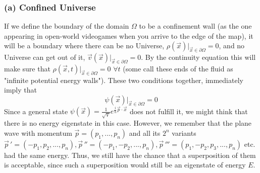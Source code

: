 \documentclass[11pt, a4paper]{article} %
\begin{document}
\subsubsection*{(a) Confined Universe}
If we define the boundary of the domain $\Omega$ to be a confinement wall (as the one appearing in open-world videogames when you arrive to the edge of the map), it will be a boundary where there can be no Universe, $\rho(\vec{x})\Big\rvert_{\vec{x}\in\partial\Omega}=0$, and no Universe can get out of it, $\vec{v}(\vec{x})\Big\rvert_{\vec{x}\in\partial\Omega}=0$. By the continuity equation this will make sure that $\rho(\vec{x},t)\Big\rvert_{\vec{x}\in\partial\Omega}=0$ $\forall t$ (some call these ends of the fluid as "infinite potential energy walls"). These two conditions together, immediately imply that 
\begin{equation}
\psi(\vec{x})\Big\rvert_{\vec{x}\in\partial\Omega}=0 
\end{equation}
Since a general state $\psi(\vec{x})=\frac{1}{\sqrt{V}}e^{\frac{i}{\hbar}\vec{p}\cdot \vec{x}}$ does not fulfill it, we might think that there is no energy eigenstate in this case. However, we remember that the plane wave with momentum $\vec{p}=(p_1,...,p_n)$ and all its $2^n$ variants $\vec{p}\,'=(-p_1,p_2,...,p_n), \vec{p}\,''=(-p_1,-p_2,...,p_n), \vec{p}\,'''=(p_1,-p_2,p_3,...,p_n)$ etc. had the same energy. Thus, we still have the chance that a superposition of them is acceptable, since such a superposition would still be an eigenstate of energy $E$. 
\end{document}
